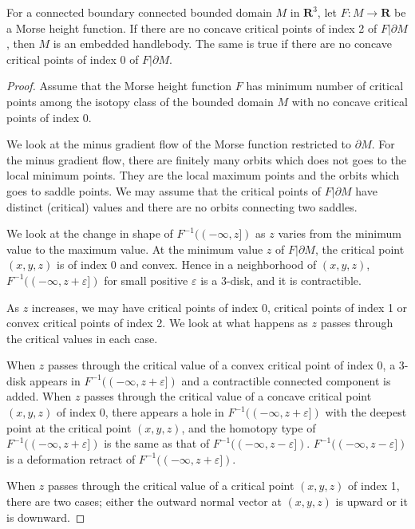 \documentclass[10pt,a4paper]{amsart}
\newcommand{\RR}{{\boldsymbol{R}}}
\newcommand{\bd}{\partial}
\newcommand{\lra}{\longrightarrow}
\begin{document}
\begin{theorem}\label{th:without_concave_critial_points}
For a connected boundary connected bounded domain $M$ in $\RR^3$, let $F:M\lra \RR$ be a Morse height function. If there are no concave critical points of index 2 of $F|\bd M$, then $M$ is an embedded handlebody. The same is true if there are no concave critical points of index 0 of $F|\bd M$.
\end{theorem}

\begin{proof}
Assume that the Morse height function $F$ has minimum number of critical points among the isotopy class of the bounded domain $M$ with no concave critical points of index 0.

We look at the minus gradient flow of the Morse function restricted to $\bd M$.
For the minus gradient flow, there are finitely many orbits which does not goes to the local minimum points. They are the local maximum points and the orbits which goes to saddle points. We may assume that the critical points of $F|\bd M$ have distinct (critical) values and there are no orbits connecting two saddles. 

We look at the change in shape of $F^{-1}((-\infty,z])$ as $z$ varies from the minimum value to the maximum value.
At the minimum value $z$ of $F|\bd M$, the critical point $(x,y,z)$ is of index 0 and convex. Hence in a neighborhood of $(x,y,z)$, $F^{-1}((-\infty,z+\varepsilon])$ for small positive $\varepsilon$ is a 3-disk, and it is contractible. 

As $z$ increases, we may have critical points of index 0, critical points of index 1 or convex critical points of index 2. We look at what happens as $z$ passes through the critical values in each case.

When $z$ passes through the critical value of a convex critical point of index 0, a 3-disk appears in $F^{-1}((-\infty,z+\varepsilon])$ 
and a contractible connected component is added. 
When $z$ passes through the critical value of a concave critical point $(x,y,z)$ of index 0, there appears a hole in $F^{-1}((-\infty,z+\varepsilon])$ with the deepest point at the critical point $(x,y,z)$, and the homotopy type of $F^{-1}((-\infty,z+\varepsilon])$ is the same as that of $F^{-1}((-\infty,z-\varepsilon])$.  $F^{-1}((-\infty,z-\varepsilon])$ is a deformation retract of $F^{-1}((-\infty,z+\varepsilon])$.

When $z$ passes through the critical value of a critical point $(x,y,z)$ of index 1, there are two cases; either the outward normal vector at $(x,y,z)$ is upward or it is downward. 


\end{proof}
\end{document}
